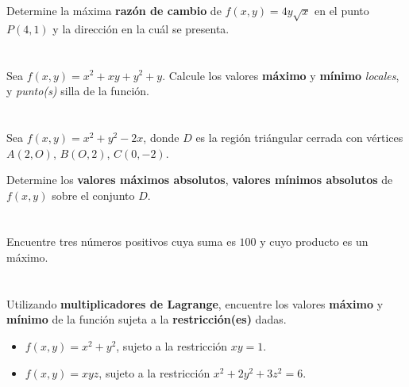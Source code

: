 \documentclass[12pt]{article}
\begin{document}
Determine la máxima \textbf{razón de cambio} de $f(x, y) = 4y\sqrt{x}$ en el punto $P(4, 1)$ y la dirección en la cuál se presenta.

\section{}

Sea $f(x, y) = x^2 + xy + y^2 + y$. Calcule los valores \textbf{máximo} y \textbf{mínimo} \textit{locales}, y \textit{punto(s)} silla de la función.

\section{}

Sea $f(x, y) = x^2 + y^2 − 2x$, donde $D$ es la región triángular cerrada con vértices $A(2, O)$, $B(O, 2)$, $C(0, -2)$.

Determine los \textbf{valores máximos absolutos}, \textbf{valores mínimos absolutos} de $f(x, y)$ sobre el conjunto $D$.

\section{}

Encuentre tres números positivos cuya suma es $100$ y cuyo producto es un máximo.

\section{}

Utilizando \textbf{multiplicadores de Lagrange}, encuentre los valores \textbf{máximo} y \textbf{mínimo} de la función sujeta a la \textbf{restricción(es)} dadas.

\begin{itemize}[format=\textbf]

\item $f(x, y) = x^2 + y^2$, sujeto a la restricción $xy = 1$.

\item $f(x, y) = xyz$, sujeto a la restricción $x^2 + 2y^2 + 3z^2 = 6$.
  
\end{itemize}
\end{document}
